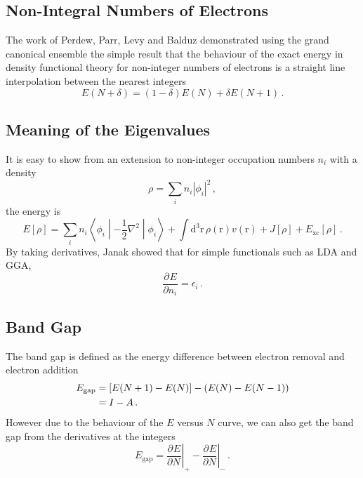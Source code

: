 \documentclass{article}
\theoremstyle{plain}\theoremheaderfont{\normalfont\itshape}\theorembodyfont{\rmfamily}\theoremseparator{.}\newtheorem*{rem}{Remark}\newtheorem*{ex}{Example}\newtheorem*{proof}{Proof}\newtheorem*{altp}{Alternative proof}
\theoremstyle{plain}\theoremheaderfont{\normalfont\bfseries}\theorembodyfont{\rmfamily}\theoremseparator{.}\newtheorem{thm}{Theorem}[section]\newtheorem{lem}[thm]{Lemma}\newtheorem{prop}[thm]{Proposition}\newtheorem*{cor}{Corollary}\newtheorem{defn}[thm]{Definition}\newtheorem{clm}[thm]{Claim}\newtheorem{clminproof}{Claim}
\theoremstyle{break}\theoremheaderfont{\normalfont\itshape}\theorembodyfont{\rmfamily}\theoremseparator{.\medskip}\newtheorem*{proofskip}{Proof}\newtheorem*{exs}{Examples}\newtheorem*{rems}{Remarks}
\theoremstyle{break}\theoremheaderfont{\normalfont\bfseries}\theorembodyfont{\rmfamily}\theoremseparator{.\medskip}\newtheorem{lemskip}[thm]{Lemma}\newtheorem{defnskip}[thm]{Definition}\newtheorem{propskip}[thm]{Proposition}\newtheorem{thmskip}[thm]{Theorem}
\numberwithin{equation}{section}
\newcommand{\dd}[2][]{\mathrm{d}^{#1} #2\,}
\newcommand{\pdv}[3][]{\frac{\partial^{#1} #2}{{\partial #3}^{#1}}}
\newcommand{\expval}[2]{\left\langle #2 \middle| #1 \middle| #2 \right\rangle}
\newcommand{\vb}[1]{\bm{\mathrm{#1}}}
\newcommand{\abs}[1]{\left| #1 \right|}
\newcommand{\laplacian}{\nabla^2}
\newcommand{\xc}{_{\text{xc}}}
\begin{document}
    \subsection{Non-Integral Numbers of Electrons}
    The work of Perdew, Parr, Levy and Balduz demonstrated using the grand canonical ensemble the simple result that the behaviour of the exact energy in density functional theory for non-integer numbers of electrons is a straight line interpolation between the nearest integers
    \begin{equation}
        E(N+\delta)=(1-\delta)E(N)+\delta E(N+1)\,.
    \end{equation}
    \subsection{Meaning of the Eigenvalues}
    It is easy to show from an extension to non-integer occupation numbers \(n_i\) with a density
    \begin{equation}
        \rho=\sum_i n_i\abs{\phi_i}^2\,,
    \end{equation}
    the energy is
    \begin{equation}
        E[\rho]=\sum_i n_i\expval{-\frac{1}{2}\laplacian}{\phi_i}+\int\dd[3]{\vb{r}}\rho(\vb{r})v(\vb{r})+J[\rho]+E\xc[\rho]\,.
    \end{equation}
    By taking derivatives, Janak showed that for simple functionals such as LDA and GGA,
    \begin{equation}
        \pdv{E}{n_i}=\epsilon_i\,.
    \end{equation}

    \subsection{Band Gap}
    The band gap is defined as the energy difference between electron removal and electron addition
    \begin{align}
        E_{\text{gap}}&=[E(N+1)-E(N)]-(E(N)-E(N-1))\notag\\
        &=I-A\,.
    \end{align}
    However due to the behaviour of the \(E\) versus \(N\) curve, we can also get the band gap from the derivatives at the integers
    \begin{equation}
        E_{\text{gap}}=\left.\pdv{E}{N}\right|_{+}-\left.\pdv{E}{N}\right|_{-}\,.
    \end{equation}
\end{document}
